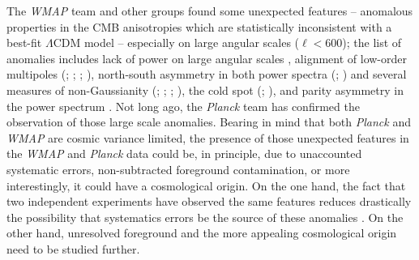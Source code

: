 The \textit{WMAP} team \cite{Spergel:2003cb} and other groups found some unexpected features -- anomalous properties in the CMB anisotropies which are statistically inconsistent with a best-fit $\Lambda$CDM model -- especially on large angular scales ($\ell < 600$); the list of anomalies includes lack of power on large angular scales \cite{Copi:2006tu}, alignment of low-order multipoles (\cite{Tegmark:2003ve}; \cite{Schwarz:2004gk}; \cite{Bielewicz:2005zu}; \cite{Land:2005ad}), north-south asymmetry in both power spectra (\cite{Eriksen:2003db}; \cite{Hansen:2008ym}) and several measures of non-Gaussianity (\cite{Eriksen:2004df}; \cite{Eriksen:2004iu}; \cite{Rath:2007ti}; \cite{Rossmanith:2009cy}), the cold spot (\cite{Vielva:2003et}; \cite{Cruz:2004ce}), and parity asymmetry in the power spectrum \cite{Kim:2010gf}. Not long ago, the \textit{Planck} team has confirmed the observation of those large scale anomalies. Bearing in mind that both \textit{Planck} and \textit{WMAP} are cosmic variance limited, the presence of those unexpected features in the \textit{WMAP} and \textit{Planck} data could be, in principle, due to unaccounted systematic errors, non-subtracted foreground contamination, or more interestingly, it could have a cosmological origin. On the one hand, the fact that two independent experiments have observed the same features reduces drastically the possibility that systematics errors be the source of these anomalies \cite{Larson:2014roa}. On the other hand, unresolved foreground and the more appealing cosmological origin need to be studied further. 

